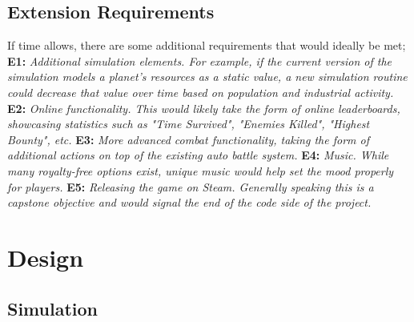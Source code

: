 \documentclass{report}
\newcommand{\req}[2]{\textbf{		#1:  }	\textit{#2}\newline\newline}
\begin{document}
\section{Extension Requirements}

If time allows, there are some additional requirements that would ideally be met;
\newline
\newline
\req{E1}{Additional simulation elements. For example, if the current version of the simulation models a planet's resources as a static value, a new simulation routine could decrease that value over time based on population and industrial activity.}
\req{E2}{Online functionality. This would likely take the form of online leaderboards, showcasing statistics such as "Time Survived", "Enemies Killed", "Highest Bounty", etc.}
\req{E3}{More advanced combat functionality, taking the form of additional actions on top of the existing auto battle system. }
\req{E4}{Music. While many royalty-free options exist, unique music would help set the mood properly for players.}
\req{E5}{Releasing the game on Steam. Generally speaking this is a capstone objective and would signal the end of the code side of the project. }

\chapter{Design}

\section{Simulation}

\end{document}
